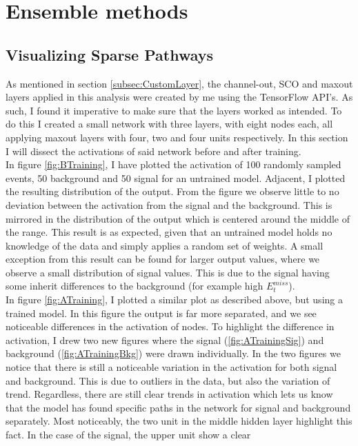\section{Ensemble methods}\label{sec:Ensemble}
\subsection{Visualizing Sparse Pathways}\label{subsec:Viz}
As mentioned in section \ref{subsec:CustomLayer}, the channel-out, \ac{SCO} and maxout layers applied in this 
analysis were created by me using the TensorFlow \ac{API}'s. As such, I found it imperative to make
sure that the layers worked as intended. To do this I created a small network with three layers, with eight 
nodes each, all applying maxout layers with four, two and four units respectively. In this section I will 
dissect the activations of said network before and after training.
\\
In figure \ref{fig:BTraining}, I have plotted the activation of 100 randomly sampled events, 50 
background and 50 signal for an untrained model. Adjacent, I plotted the resulting distribution of the 
output. From the figure we observe little to no deviation between the activation from the signal and 
the background. This is mirrored in the distribution of the output which is centered around the middle 
of the range. This result is as expected, given that an untrained model holds no knowledge of the data and 
simply applies a random set of weights. A small exception from this result can be found for larger output values, 
where we observe a small distribution of signal values. This is due to the signal having some inherit differences
to the background (for example high $E_t^{miss}$).
\\
In figure \ref{fig:ATraining}, I plotted a similar plot as described above, but using a trained model.
In this figure the output is far more separated, and we see noticeable differences in the activation 
of nodes. To highlight the difference in activation, I drew two new figures where the signal 
(\ref{fig:ATrainingSig}) and background (\ref{fig:ATrainingBkg}) were drawn individually.
In the two figures we notice that there is still a noticeable variation in the activation for
both signal and background. This is due to outliers in the data, but also the variation of trend.
Regardless, there are still clear trends in activation which lets us know that the model has found 
specific paths in the network for signal and background separately. Most noticeably, the two unit 
in the middle hidden layer highlight this fact. In the case of the signal, the upper unit show a clear 
